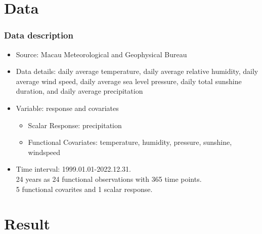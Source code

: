 \documentclass[
	9pt, %
]{beamer}
\begin{document}
\section{Data}

\begin{frame}
	\frametitle{Data description}	
	\begin{itemize}
	\item Source: Macau Meteorological and Geophysical Bureau
	\bigskip
	\item Data details: daily average temperature, daily average relative humidity, daily average wind speed, daily average sea level pressure, daily total sunshine duration, and daily average precipitation
	\bigskip
	\item Variable: response and covariates
		\begin{itemize}
		\item Scalar Response: precipitation
		\item Functional Covariates: temperature, humidity, pressure, sunshine, windspeed
		\end{itemize}
	\bigskip
	\item Time interval: 1999.01.01-2022.12.31.\\
		24 years as 24 functional observations with 365 time points.\\
		5 functional covarites and 1 scalar response.
	\end{itemize}
\end{frame}
\section{Result}
\end{document}
